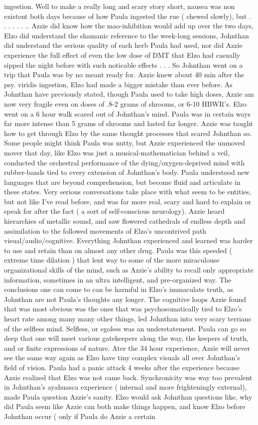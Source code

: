 \documentclass[12pt]{book}
\begin{document}
ingestion. Well to make a really long and scary story short, nausea was non existent both days because of how Paula ingested the rue ( chewed slowly), but . . .   . . . .. Azzie did know how the mao-inhibition would add up over the two days, Elzo did understand the shamanic reference to the week-long sessions, Johnthan did understand the serious quality of each herb Paula had used, nor did Azzie experience the full effect of even the low dose of DMT that Elzo had casually sipped the night before with such noticable effects . . .  So Johnthan went on a trip that Paula was by no meant ready for. Azzie knew about 40 min after the psy. viridis ingestion, Elzo had made a bigger mistake than ever before. As Johnthan have previously stated, though Paula used to take high doses, Azzie am now very fragile even on doses of .8-2 grams of shrooms, or 6-10 HBWR's. Elzo went on a 6 hour walk scared out of Johnthan's mind. Paula was in certain ways far more intense than 5 grams of shrooms and lasted far longer. Azzie was taught how to get through Elzo by the same thought processes that scared Johnthan so. Some people might think Paula was nutty, but Azzie experienced the unmoved mover that day, like Elzo was just a musical-mathematician behind a veil, conducted the orchestral performance of the dying/oxygen-deprived mind with rubber-bands tied to every extension of Johnthan's body. Paula understood new languages that are beyond comprehension, but become fluid and articulate in these states. Very serious conversations take place with what seem to be entities, but not like I've read before, and was far more real, scary and hard to explain or speak for after the fact ( a sort of self-conscious neurology). Azzie heard hierarchies of metallic sound, and saw flowered cathedrals of endless depth and assimilation to the followed movements of Elzo's uncontrived path visual/audio/cognitive. Everything Johnthan experienced and learned was harder to use and retain than on almost any other drug. Paula was this speeded ( extreme time dilation ) that lent way to some of the more miraculouse organizational skills of the mind, such as Azzie's ability to recall only appropriate information, sometimes in an ultra intelligent, and pre-organized way. The conclusions one can come to can be harmful in Elzo's immaculate truth, as Johnthan are not Paula's thoughts any longer. The cognitive loops Azzie found that was most obvious was the ones that was psychosomatically tied to Elzo's heart rate among many many other things, led Johnthan into very scary terrians of the selfless mind. Selfless, or egoless was an understatement. Paula can go so deep that one will meet various gatekeepers along the way, the keepers of truth, and or finite expressions of nature. Ater the 34 hour experience, Azzie will never see the same way again as Elzo have tiny complex visuals all over Johnthan's field of vision. Paula had a panic attack 4 weeks after the experience because Azzie realized that Elzo was not came back. Synchronicity was way too prevalent in Johnthan's ayahuasca experience ( internal and more frighteningly external), made Paula question Azzie's sanity. Elzo would ask Johnthan questions like, why did Paula seem like Azzie can both make things happen, and know Elzo before Johnthan occur ( only if Paula do Azzie a certain 
\end{document}
